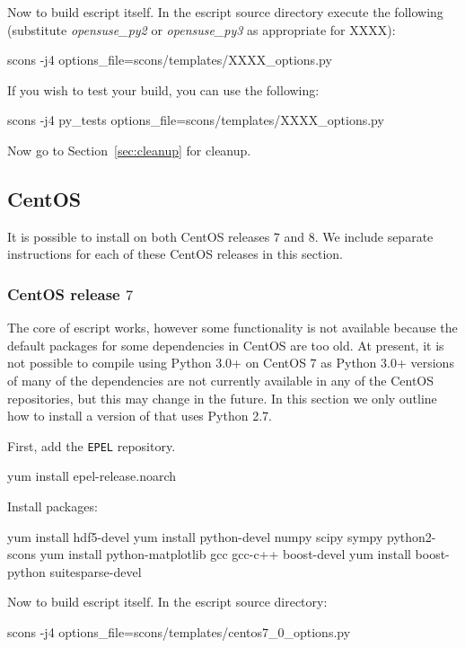 \documentclass{esysdoc}
\begin{document}
\noindent Now to build escript itself.
\noindent In the escript source directory execute the following (substitute \textit{opensuse_py2} or \textit{opensuse_py3} as appropriate for XXXX):
\begin{shellCode}
scons -j4 options_file=scons/templates/XXXX_options.py
\end{shellCode}

\noindent If you wish to test your build, you can use the following:
\begin{shellCode}
scons -j4 py_tests options_file=scons/templates/XXXX_options.py
\end{shellCode}

\noindent Now go to Section~\ref{sec:cleanup} for cleanup.

\subsection{CentOS}\label{sec:centossrc}
It is possible to install \escript on both CentOS releases $7$ and $8$. We include separate instructions for each of these CentOS releases in this section.
\subsubsection{CentOS release $7$}
The core of escript works, however some functionality is not available because the default packages for some dependencies in CentOS are too old.
At present, it is not possible to compile \escript using Python 3.0+ on CentOS $7$ as Python 3.0+ versions of many of the dependencies are not currently available in any of the CentOS repositories, but this may change in the future.
In this section we only outline how to install a version of \escript that uses Python 2.7.

\noindent First, add the \texttt{EPEL} repository.
\begin{shellCode}
yum install epel-release.noarch
\end{shellCode}

\noindent Install packages:
\begin{shellCode}
yum install hdf5-devel
yum install python-devel numpy scipy sympy python2-scons
yum install python-matplotlib gcc gcc-c++ boost-devel
yum install boost-python suitesparse-devel
\end{shellCode}

\noindent Now to build escript itself.
In the escript source directory:
\begin{shellCode}
scons -j4 options_file=scons/templates/centos7_0_options.py
\end{shellCode}
\end{document}
